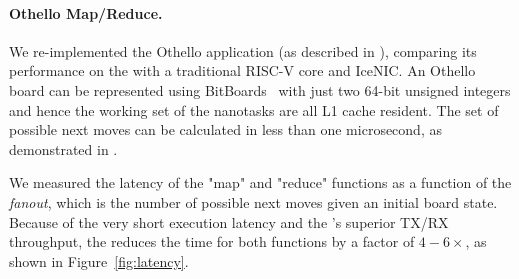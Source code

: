 
\paragraph{Othello Map/Reduce.} We re-implemented the Othello application (as described in \cite{lnic}), comparing its performance on the \name{} with a traditional RISC-V core and IceNIC.
An Othello board can be represented using BitBoards~\cite{bitboard} with just two 64-bit unsigned integers and hence the working set of the nanotasks are all L1 cache resident.
The set of possible next moves can be calculated in less than one microsecond, as demonstrated in \cite{lnic}.

We measured the latency of the "map" and "reduce" functions as a function of the {\em fanout}, which is the number of possible next moves given an initial board state.
Because of the very short execution latency and the \name{}'s superior TX/RX throughput, the \name{} reduces the time for both functions by a factor of $4-6\times$, as shown in Figure~\ref{fig:latency}.

%

